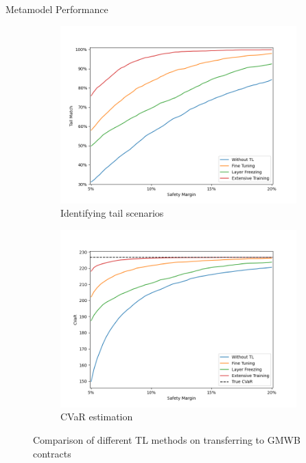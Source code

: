 \documentclass[9pt,handout]{beamer}
\begin{document}
\begin{frame}{Metamodel Performance}
    \begin{figure}[ht]
        \centering
        \begin{subfigure}{0.48\textwidth}
            \includegraphics[width=\textwidth]{../project3/figures/figure4_1.png}
            \caption{Identifying tail scenarios}
        \end{subfigure}
        \begin{subfigure}{0.48\textwidth}
            \includegraphics[width=\textwidth]{../project3/figures/figure4_2.png}
            \caption{CVaR estimation}
        \end{subfigure}
        \caption{Comparison of different TL methods on transferring to GMWB contracts}
    \end{figure}
    

\end{frame}
\end{document}
